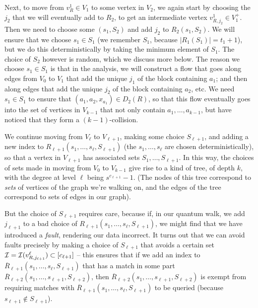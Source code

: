 \documentclass{article}
\renewcommand{\>}{\rangle}
\newcommand{\<}{\langle}
\renewcommand{\(}{\left(}
\renewcommand{\)}{\right)}
\begin{document}
Next, to move from $v_R^1\in V_1$ to some vertex in $V_2$, we again start by choosing the $j_2$ that we will eventually add to $R_2$, to get an intermediate vertex $v_{R,j_2}^1\in V_1^+$. Then we need to choose some $(s_1,S_2)$ and add $j_2$ to $R_2(s_1,S_2)$. We will ensure that we choose $s_1\in S_1$ (we remember $S_1$, because $|R_1(S_1)|=t_1+1$), but we do this deterministically by taking the minimum element of $S_1$. The choice of $S_2$ however is random, which we discuss more below. The reason we choose $s_1\in S_1$ is that in the analysis, we will construct a flow that goes along edges from $V_0$ to $V_1$ that add the unique $j_1$ of the block containing $a_1$; and then along edges that add the unique $j_2$ of the block containing $a_2$, etc. We need $s_1\in S_1$ to ensure that $(a_1,a_2,x_{a_1})\in D_2(R)$, so that this flow eventually goes into the set of vertices in $V_{k-1}$ that not only contain $a_1,\dots,a_{k-1}$, but have noticed that they form a $(k-1)$-collision. 

We continue moving from $V_{\ell}$ to $V_{\ell+1}$, making some choice $S_{\ell+1}$, and adding a new index to $R_{\ell+1}(s_1,\dots,s_{\ell},S_{\ell+1})$ (the $s_1,\dots,s_{\ell}$ are chosen deterministically), so that a vertex in $V_{\ell+1}$ has associated sets $S_1,\dots,S_{\ell+1}$. 
In this way, the choices of sets made in moving from $V_0$ to $V_{k-1}$ give rise to a kind of tree, of depth $k$, with the degree at level $\ell$ being $s^{c_{\ell+1}}-1$. (The nodes of this tree correspond to \emph{sets} of vertices of the graph we're walking on, and the edges of the tree correspond to sets of edges in our graph).

But the choice of $S_{\ell+1}$ requires care, because if, in our quantum walk, we add $j_{\ell+1}$ to a bad choice of $R_{\ell+1}(s_1,\dots,s_{\ell},S_{\ell+1})$, we might find that we have introduced a \emph{fault}, rendering our data incorrect. It turns out that we can avoid faults precisely by making a choice of ${S}_{\ell+1}$ that avoids a certain set ${\cal I}={\cal I}(v_{R,j_{\ell+1}}^{\ell})\subset [c_{\ell+1}]$ -- this ensures that if we add an index to $\overline{R}_{\ell+1}(s_1,\dots,s_{\ell},S_{\ell+1})$ that has a match in some part $\overline{R}_{\ell+2}(s_1,\dots,s_{\ell+1},S_{\ell+2})$, then $\overline{R}_{\ell+2}(s_1,\dots,s_{\ell+1},S_{\ell+2})$ is exempt from requiring matches with $\overline{R}_{\ell+1}(s_1,\dots,s_{\ell},S_{\ell+1})$ to be queried (because $s_{\ell+1}\not\in S_{\ell+1}$). 
\end{document}
